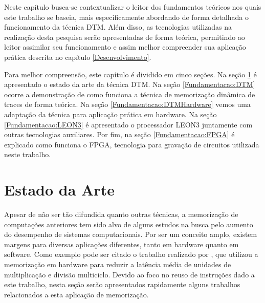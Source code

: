 \label{Fundamentacao}
%
%
%

Neste capítulo busca-se contextualizar o leitor dos fundamentos teóricos nos quais este trabalho se baseia, mais especificamente abordando de forma detalhada o funcionamento da técnica DTM. Além disso, as tecnologias utilizadas na realização desta pesquisa serão apresentadas de forma teórica, permitindo ao leitor assimilar seu funcionamento e assim melhor compreender sua aplicação prática descrita no capítulo \ref{Desenvolvimento}.

Para melhor compreensão, este capítulo é dividido em cinco seções. Na seção \ref{Fundamentacao:EstadoArte} é apresentado o estado da arte da técnica DTM. Na seção \ref{Fundamentacao:DTM} ocorre a demonstração de como funciona a técnica de memorização dinâmica de traces de forma teórica. Na seção \ref{Fundamentacao:DTMHardware} vemos uma adaptação da técnica para aplicação prática em hardware. Na seção \ref{Fundamentacao:LEON3} é apresentado o processador LEON3 juntamente com outras tecnologias auxiliares. Por fim, na seção \ref{Fundamentacao:FPGA} é explicado como funciona o FPGA, tecnologia para gravação de circuitos utilizada neste trabalho.

\section{Estado da Arte}
\label{Fundamentacao:EstadoArte}

Apesar de não ser tão difundida quanto outras técnicas, a memorização de computações anteriores tem sido alvo de alguns estudos na busca pelo aumento do desempenho de sistemas computacionais. Por ser um conceito amplo, existem margens para diversas aplicações diferentes, tanto em hardware quanto em software. Como exemplo pode ser citado o trabalho realizado por \cite{citron1998accelerating}, que utilizou a memorização em hardware para reduzir a latência média de unidades de multiplicação e divisão multiciclo. Devido ao foco no reuso de instruções dado a este trabalho, nesta seção serão apresentados rapidamente alguns trabalhos relacionados a esta aplicação de memorização.

